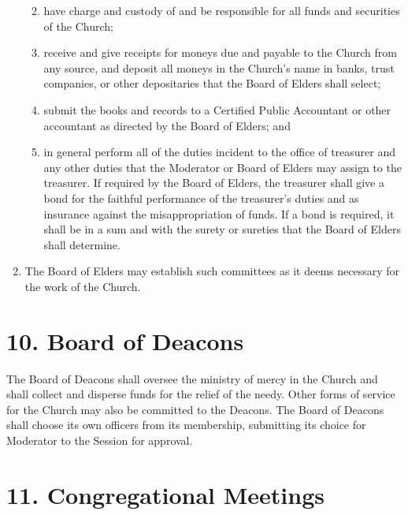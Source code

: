 \documentclass[
]{book}
\providecommand{\tightlist}{%
  \setlength{\itemsep}{0pt}\setlength{\parskip}{0pt}}
\begin{document}
\begin{enumerate}
  \begin{enumerate}
  \def\labelenumii{(\arabic{enumii})}
  \tightlist
  \item
    have charge and custody of and be responsible for all funds and securities of the Church;
  \item
    receive and give receipts for moneys due and payable to the Church from any source, and deposit all moneys in the Church's name in banks, trust companies, or other deposit­ar­­ies that the Board of Elders shall select;
  \item
    submit the books and records to a Certified Public Accoun­tant or other accountant as directed by the Board of Elders; and
  \item
    in general perform all of the duties inci­dent to the office of treasurer and any other duties that the Moderator or Board of Elders may assign to the treasurer.
    If required by the Board of Elders, the treasurer shall give a bond for the faithful perfor­mance of the treasurer's duties and as insurance against the misappropriation of funds. If a bond is required, it shall be in a sum and with the surety or sureties that the Board of Elders shall determine.
  \end{enumerate}
\item
  The Board of Elders may establish such committees as it deems necessary for the work of the Church.
\end{enumerate}

\hypertarget{board-of-deacons}{%
\section*{10. Board of Deacons}\label{board-of-deacons}}

The Board of Deacons shall oversee the ministry of mercy in the Church and shall collect and dis­perse funds for the relief of the needy. Other forms of service for the Church may also be commit­ted to the Deacons. The Board of Deacons shall choose its own officers from its membership, submitting its choice for Moderator to the Session for approval.

\hypertarget{congregational-meetings}{%
\section*{11. Congregational Meetings}\label{congregational-meetings}}
\end{document}
